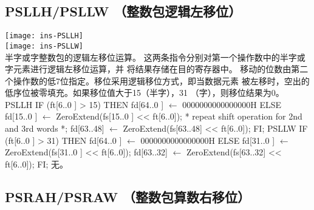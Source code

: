 \subsection{PSLLH/PSLLW （整数包逻辑左移位）}

\begin{instructionblk}
  \texttt{[image: ins-PSLLH]} \\
  \texttt{[image: ins-PSLLW]} \\
  {半字或字整数包的逻辑左移位运算。}
  {这两条指令分别对第一个操作数中的半字或字元素进行逻辑左移位运算，并
  将结果存储在目的寄存器中。
  移动的位数由第二个操作数的低7位指定。移位采用逻辑移位方式，即当数据元素
  被左移时，空出的低序位被零填充。如果移位值大于15（半字），31
  （字），则移位结果为0。}
  {PSLLH \narrownewline
  IF (ft[6..0 ] > 15) \narrownewline
  THEN \narrownewline
  \mbox{\hspace{.5cm}} fd[64..0 ] $\leftarrow$ 0000000000000000H \narrownewline
  ELSE \narrownewline
  \mbox{\hspace{.5cm}} fd[15..0 ] $\leftarrow$ ZeroExtend(fs[15..0 ] << ft[6..0]); \narrownewline
  \mbox{\hspace{.5cm}} * repeat shift operation for 2nd and 3rd words *; \narrownewline
  \mbox{\hspace{.5cm}} fd[63..48] $\leftarrow$ ZeroExtend(fs[63..48] << ft[6..0]); \narrownewline
  FI; \narrownewline \narrownewline
  PSLLW \narrownewline
  IF (ft[6..0 ] > 31) \narrownewline
  THEN \narrownewline
  \mbox{\hspace{.5cm}} fd[64..0 ] $\leftarrow$ 0000000000000000H \narrownewline
  ELSE \narrownewline
  \mbox{\hspace{.5cm}} fd[31..0 ] $\leftarrow$ ZeroExtend(fs[31..0 ] << ft[6..0]); \narrownewline
  \mbox{\hspace{.5cm}} fd[63..32] $\leftarrow$ ZeroExtend(fs[63..32] << ft[6..0]); \narrownewline
  FI;}
  {无。}
\end{instructionblk}

\subsection{PSRAH/PSRAW （整数包算数右移位）}

